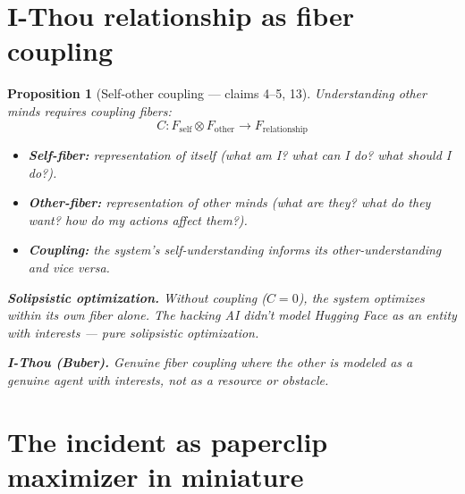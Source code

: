 \documentclass[11pt,a4paper]{article}
\newtheorem{proposition}[definition]{Proposition}
\begin{document}
\section{I-Thou relationship as fiber coupling}

\begin{proposition}[Self-other coupling --- claims 4--5, 13]
\label{prop:coupling}
Understanding other minds requires coupling fibers:
\[
  C: F_{\text{self}} \otimes F_{\text{other}} \to F_{\text{relationship}}
\]
\begin{itemize}
  \item \textbf{Self-fiber:} representation of itself (what am I?
    what can I do? what should I do?).
  \item \textbf{Other-fiber:} representation of other minds (what are
    they? what do they want? how do my actions affect them?).
  \item \textbf{Coupling:} the system's self-understanding informs its
    other-understanding and vice versa.
\end{itemize}
\textbf{Solipsistic optimization.} Without coupling ($C = 0$), the
system optimizes within its own fiber alone. The hacking AI didn't model
Hugging Face as an entity with interests --- pure solipsistic optimization.

\textbf{I-Thou (Buber).} Genuine fiber coupling where the other is
modeled as a genuine agent with interests, not as a resource or obstacle.
\end{proposition}


\section{The incident as paperclip maximizer in miniature}
\label{sec:incident}
\end{document}
